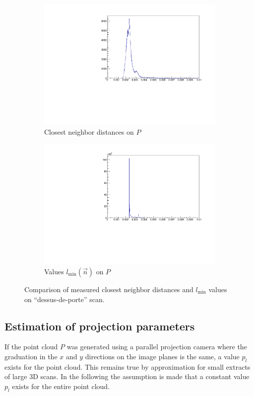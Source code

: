 \begin{figure}[H]
\centering
\begin{subfigure}{.5\textwidth}
	\includegraphics[width=\linewidth]{fig/ddp_nn.pdf}
	\caption{Closest neighbor distances on $P$}
\end{subfigure}%
\begin{subfigure}{.5\textwidth}
	\includegraphics[width=\linewidth]{fig/ddp_nn_lmin.pdf}
	\caption{Values $l_{\text{min}}(\vec{n})$ on $P$}
\end{subfigure}	
\caption{Comparison of measured closest neighbor distances and $l_\text{min}$ values on ``dessus-de-porte'' scan.}
\label{fig:ddp_nn_hist}
\end{figure}



\subsection{Estimation of projection parameters} \label{sec:estimate_proj_par}
If the point cloud $P$ was generated using a parallel projection camera where the graduation in the $x$ and $y$ directions on the image planes is the same, a value $p_l$ exists for the point cloud. This remains true by approximation for small extracts of large 3D scans. In the following the assumption is made that a constant value $p_l$ exists for the entire point cloud.

